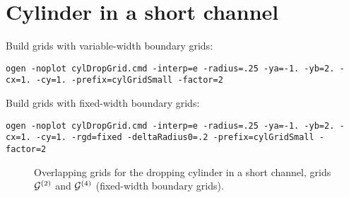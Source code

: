 \documentclass[11pt]{article}
\begin{document}



\section{Cylinder in a short channel}

Build grids with variable-width boundary grids:
\begin{lstlisting}
ogen -noplot cylDropGrid.cmd -interp=e -radius=.25 -ya=-1. -yb=2. -cx=1. -cy=1. -prefix=cylGridSmall -factor=2
\end{lstlisting}

Build grids with fixed-width boundary grids:
\begin{lstlisting}
ogen -noplot cylDropGrid.cmd -interp=e -radius=.25 -ya=-1. -yb=2. -cx=1. -cy=1. -rgd=fixed -deltaRadius0=.2 -prefix=cylGridSmall -factor=2
\end{lstlisting}
{
\begin{figure}[hbt]
\newcommand{\figWidth}{7cm}
\newcommand{\trimfig}[2]{\trimh{#1}{#2}{0.2}{.2}{.05}{.1}}
\begin{center}\small
\caption{
Overlapping grids for the dropping cylinder in a short channel, grids ${\mathcal G}^{(2)}$ and ${\mathcal G}^{(4)}$
(fixed-width boundary grids).
}
\label{fig:cylDropGrid}
\end{center}
\end{figure}
}


\end{document}

